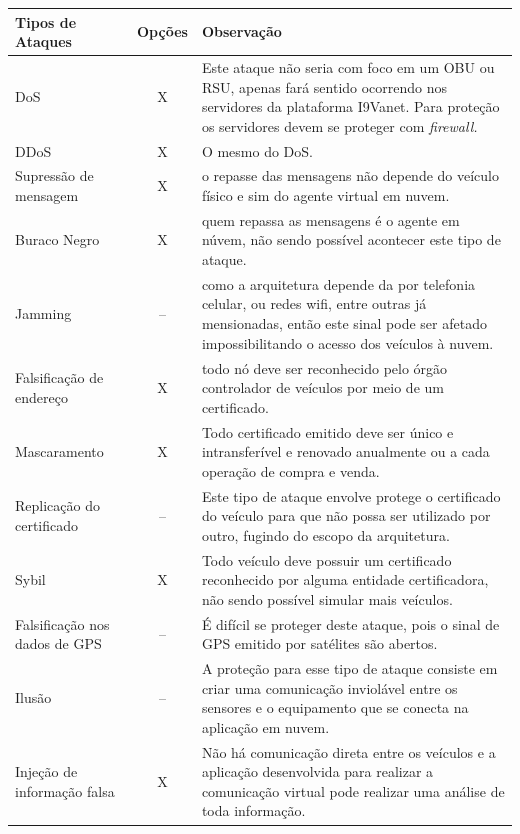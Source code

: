 \documentclass[
	12pt,				%
	oneside,			%
	a4paper,			%
	english,			%
	brazil				%
	]{abntex2ppgsi}
\begin{document}
\begin{longtable}{|l|c| p{}|} 
	\hline
		\hline
		\rowcolor[gray]{0.7}
		Tipos de Ataques & Opções & Observação \\ \hline
		DoS	&  X & Este ataque não seria com foco em um OBU ou RSU, apenas fará sentido ocorrendo nos servidores da plataforma I9Vanet. Para proteção os servidores devem se proteger com \textit{firewall.}   \\ \hline
		DDoS & X & O mesmo do DoS. \\ \hline
		Supressão de mensagem	&  X &  o repasse das mensagens não depende do veículo físico e sim do agente virtual em nuvem.\\ \hline
		Buraco Negro	& X  & quem repassa as mensagens é o agente em núvem, não sendo possível acontecer este tipo de ataque. \\ \hline
		Jamming	&  -- & como a arquitetura depende da por telefonia celular, ou redes wifi, entre outras já mensionadas, então este sinal pode ser afetado impossibilitando o acesso dos veículos à nuvem. \\ \hline
		Falsificação de endereço	&  X & todo nó deve ser reconhecido pelo órgão controlador de veículos por meio de um certificado. \\ \hline
		Mascaramento	&  X & Todo certificado emitido deve ser único e intransferível e renovado anualmente ou a cada operação de compra e venda. \\ \hline
		Replicação do certificado	&  -- & Este tipo de ataque envolve protege o certificado do veículo para que não possa ser utilizado por outro, fugindo do escopo da arquitetura.\\ \hline
		Sybil	&  X & Todo veículo deve possuir um certificado reconhecido por alguma entidade certificadora, não sendo possível simular mais veículos.\\ \hline
		Falsificação nos dados de GPS &  -- & É difícil se proteger deste ataque, pois o sinal de GPS emitido por satélites são abertos.\\ \hline
		Ilusão	&  -- & A proteção para esse tipo de ataque consiste em criar uma comunicação inviolável entre os sensores e o equipamento que se conecta na aplicação em nuvem. \\ \hline
		Injeção de informação falsa	&  X & Não há comunicação direta entre os veículos e a aplicação desenvolvida para realizar a comunicação virtual pode realizar uma análise de toda informação. \\ \hline

\end{longtable}
\end{document}
